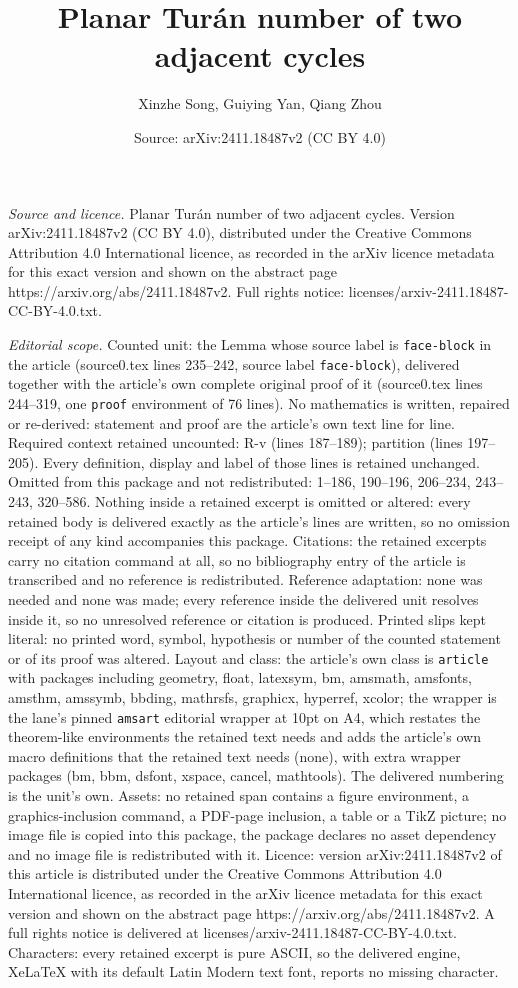\documentclass[10pt,a4paper]{amsart}
\title[Planar Tur\'an number of two adjacent cycles]{Planar Tur\'an number of two adjacent cycles}
\author{Xinzhe Song, Guiying Yan, Qiang Zhou}
\date{Source: arXiv:2411.18487v2 (CC BY 4.0)}
\begin{document}
\maketitle

\noindent\emph{Source and licence.} Planar Tur\'an number of two adjacent cycles. Version arXiv:2411.18487v2 (CC BY 4.0), distributed under the Creative Commons Attribution 4.0 International licence, as recorded in the arXiv licence metadata for this exact version and shown on the abstract page https://arxiv.org/abs/2411.18487v2. Full rights notice: licenses/arxiv-2411.18487-CC-BY-4.0.txt.\par\smallskip

\noindent\textit{Editorial scope.} Counted unit: the Lemma whose source label is \texttt{face-block} in the article (source0.tex lines 235--242, source label \texttt{face-block}), delivered together with the article's own complete original proof of it (source0.tex lines 244--319, one \texttt{proof} environment of 76 lines). No mathematics is written, repaired or re-derived: statement and proof are the article's own text line for line. Required context retained uncounted: R-v (lines 187--189); partition (lines 197--205). Every definition, display and label of those lines is retained unchanged. Omitted from this package and not redistributed: 1--186, 190--196, 206--234, 243--243, 320--586. Nothing inside a retained excerpt is omitted or altered: every retained body is delivered exactly as the article's lines are written, so no omission receipt of any kind accompanies this package. Citations: the retained excerpts carry no citation command at all, so no bibliography entry of the article is transcribed and no reference is redistributed. Reference adaptation: none was needed and none was made; every reference inside the delivered unit resolves inside it, so no unresolved reference or citation is produced. Printed slips kept literal: no printed word, symbol, hypothesis or number of the counted statement or of its proof was altered. Layout and class: the article's own class is \texttt{article} with packages including geometry, float, latexsym, bm, amsmath, amsfonts, amsthm, amssymb, bbding, mathrsfs, graphicx, hyperref, xcolor; the wrapper is the lane's pinned \texttt{amsart} editorial wrapper at 10pt on A4, which restates the theorem-like environments the retained text needs and adds the article's own macro definitions that the retained text needs (none), with extra wrapper packages (bm, bbm, dsfont, xspace, cancel, mathtools). The delivered numbering is the unit's own. Assets: no retained span contains a figure environment, a graphics-inclusion command, a PDF-page inclusion, a table or a TikZ picture; no image file is copied into this package, the package declares no asset dependency and no image file is redistributed with it. Licence: version arXiv:2411.18487v2 of this article is distributed under the Creative Commons Attribution 4.0 International licence, as recorded in the arXiv licence metadata for this exact version and shown on the abstract page https://arxiv.org/abs/2411.18487v2. A full rights notice is delivered at licenses/arxiv-2411.18487-CC-BY-4.0.txt. Characters: every retained excerpt is pure ASCII, so the delivered engine, XeLaTeX with its default Latin Modern text font, reports no missing character.
\end{document}
